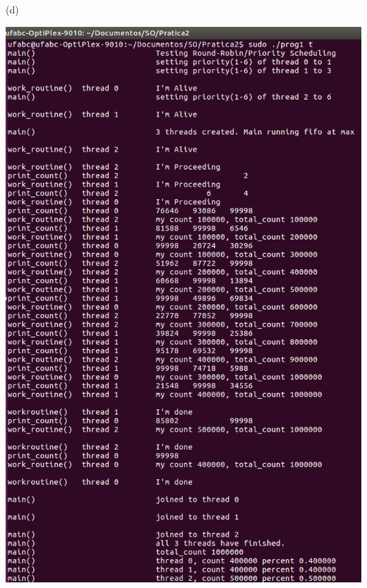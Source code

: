 \begin{minipage}{\textwidth}
\begin{minipage}[b]{0.32\textwidth}
        (d)
    \end{minipage}
    \hfill
    \begin{minipage}[b]{0.32\textwidth}
        \centering
        \includegraphics[trim=0 0 0 0,clip,scale=.25]{pratica2/prog1-t.png}
        

\end{minipage}
\end{minipage}

